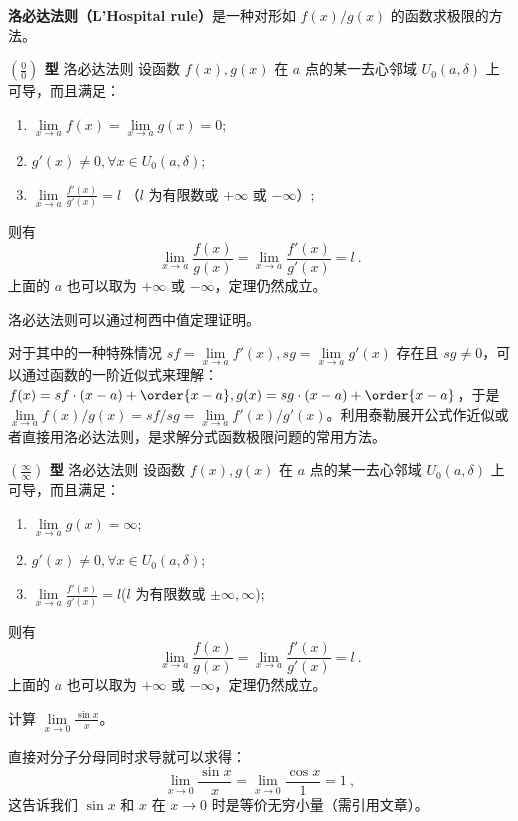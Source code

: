

\textbf{洛必达法则（L'Hospital rule）}是一种对形如 $f(x)/g(x)$ 的函数求极限的方法。

\begin{theorem}{\textbf{$\left(\frac{0}{0}\right)$ 型} 洛必达法则}
设函数 $f(x),g(x)$ 在 $a$ 点的某一去心邻域 $U_0(a,\delta)$ 上可导，而且满足：
\begin{enumerate}
\item $\lim\limits_{x\rightarrow a} f(x)=\lim\limits_{x\rightarrow a}g(x)=0$;
\item $g'(x)\neq 0,\forall x\in U_0(a,\delta)$;
\item $\displaystyle\lim\limits_{x\rightarrow a} \frac{f'(x)}{g'(x)}=l$ （$l$ 为有限数或 $+\infty$ 或 $-\infty$）;
\end{enumerate}
则有
\begin{equation}
\lim\limits_{x\rightarrow a}\frac{f(x)}{g(x)}=\lim\limits_{x\rightarrow a}\frac{f'(x)}{g'(x)}=l~.
\end{equation}
上面的 $a$ 也可以取为 $+\infty$ 或 $-\infty$，定理仍然成立。
\end{theorem}
洛必达法则可以通过柯西中值定理证明。

对于其中的一种特殊情况 $sf=\lim\limits_{x\rightarrow a}f'(x),sg=\lim\limits_{x\rightarrow a}g'(x)$ 存在且 $sg\neq 0$，可以通过函数的一阶近似式来理解：$f(x)=sf\cdot (x-a)+\order{x-a},g(x)=sg\cdot (x-a)+\order{x-a}$，于是 $\lim\limits_{x\rightarrow a}f(x)/g(x)=sf/sg=\lim\limits_{x\rightarrow a}f'(x)/g'(x)$。利用泰勒展开公式作近似或者直接用洛必达法则，是求解分式函数极限问题的常用方法。

\begin{theorem}{\textbf{$\left(\frac{\infty}{\infty}\right)$ 型} 洛必达法则}
设函数 $f(x),g(x)$ 在 $a$ 点的某一去心邻域 $U_0(a,\delta)$ 上可导，而且满足：
\begin{enumerate}
\item $\lim\limits_{x\rightarrow a} g(x)=\infty$;
\item $g'(x)\neq 0,\forall x\in U_0(a,\delta)$;
\item $\lim\limits_{x\rightarrow a} \frac{f'(x)}{g'(x)}=l$($l$ 为有限数或 $\pm\infty,\infty$);
\end{enumerate}
则有
\begin{equation}
\lim\limits_{x\rightarrow a}\frac{f(x)}{g(x)}=\lim\limits_{x\rightarrow a}\frac{f'(x)}{g'(x)}=l~.
\end{equation}
上面的 $a$ 也可以取为 $+\infty$ 或 $-\infty$，定理仍然成立。
\end{theorem}
\begin{exercise}{}
计算 $\lim\limits_{x\rightarrow 0}\frac{\sin x}{x}$。
\end{exercise}
直接对分子分母同时求导就可以求得：
\begin{equation}
    \lim\limits_{x\rightarrow 0}\frac{\sin x}{x}=\lim\limits_{x\rightarrow 0}\frac{\cos x}{1}=1~,
\end{equation}
这告诉我们 $\sin x$ 和 $x$ 在 $x\rightarrow 0$ 时是等价无穷小量（需引用文章）。

